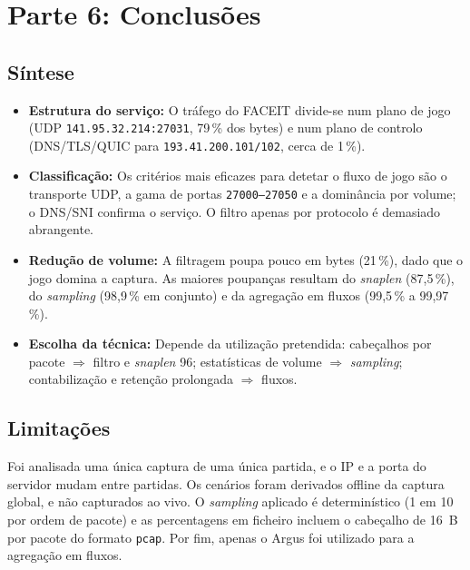 \documentclass[11pt, a4paper]{article}
\begin{document}
\section{Parte 6: Conclusões}

\subsection{Síntese}
\begin{itemize}
    \item \textbf{Estrutura do serviço:} O tráfego do FACEIT divide-se num plano de jogo (UDP \texttt{141.95.32.214:27031}, 79\,\% dos bytes) e num plano de controlo (DNS/TLS/QUIC para \texttt{193.41.200.101/102}, cerca de 1\,\%).
    \item \textbf{Classificação:} Os critérios mais eficazes para detetar o fluxo de jogo são o transporte UDP, a gama de portas \texttt{27000--27050} e a dominância por volume; o DNS/SNI confirma o serviço. O filtro apenas por protocolo é demasiado abrangente.
    \item \textbf{Redução de volume:} A filtragem poupa pouco em bytes (21\,\%), dado que o jogo domina a captura. As maiores poupanças resultam do \textit{snaplen} (87,5\,\%), do \textit{sampling} (98,9\,\% em conjunto) e da agregação em fluxos (99,5\,\% a 99,97\,\%).
    \item \textbf{Escolha da técnica:} Depende da utilização pretendida: cabeçalhos por pacote $\Rightarrow$ filtro e \textit{snaplen} 96; estatísticas de volume $\Rightarrow$ \textit{sampling}; contabilização e retenção prolongada $\Rightarrow$ fluxos.
\end{itemize}

\subsection{Limitações}
Foi analisada uma única captura de uma única partida, e o IP e a porta do servidor mudam entre partidas. Os cenários foram derivados offline da captura global, e não capturados ao vivo. O \textit{sampling} aplicado é determinístico (1 em 10 por ordem de pacote) e as percentagens em ficheiro incluem o cabeçalho de 16~B por pacote do formato \texttt{pcap}. Por fim, apenas o Argus foi utilizado para a agregação em fluxos.

\appendix
\end{document}
